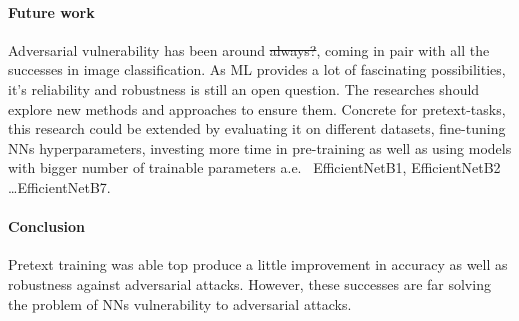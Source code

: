\paragraph{Future work}
Adversarial vulnerability has been around \st{always?}, coming in pair with all the successes in image classification.
As ML provides a lot of fascinating possibilities, it's reliability and robustness is still an open question.
The researches should explore new methods and approaches to ensure them.
Concrete for pretext-tasks, this research could be extended by evaluating it on different datasets, fine-tuning NNs
hyperparameters, investing more time in pre-training as well as using models with bigger number of trainable parameters
a.e. \ EfficientNetB1, EfficientNetB2 \ldots EfficientNetB7.

\paragraph{Conclusion}
Pretext training was able top produce a little improvement in accuracy as well as robustness against adversarial attacks.
However, these successes are far solving the problem of NNs vulnerability to adversarial attacks.

